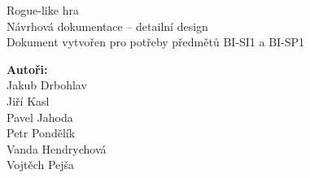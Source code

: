 \documentclass[12pt,a4paper]{article}
\begin{document}



\renewcommand{\headrulewidth}{0pt}
\renewcommand{\footrulewidth}{0pt}

\begin{titlepage}
  \thispagestyle{fancy}

	\vspace*{\fill}
	\begin{center}
    {\fontsize{28.83}{100}\selectfont Rogue-like hra}\\[0.6cm]
		{\fontsize{15.74}{40}\selectfont Návrhová dokumentace -- detailní design}\\[1.5cm]
    {\fontsize{10}{10} \selectfont Dokument vytvořen pro potřeby předmětů
    BI-SI1 a BI-SP1}\\
	\end{center}

	\vspace*{\fill}

  {\fontsize{10}{10} \selectfont \noindent
\textbf{Autoři:}\\
  Jakub Drbohlav\\
  Jiří Kasl\\
  Pavel Jahoda\\
  Petr Pondělík\\
  Vanda Hendrychová\\
  Vojtěch Pejša\\
  }
\end{titlepage}

\newpage

\renewcommand{\headrulewidth}{0.4pt}
\renewcommand{\footrulewidth}{0.4pt}






\tableofcontents

\newpage

\end{document}
